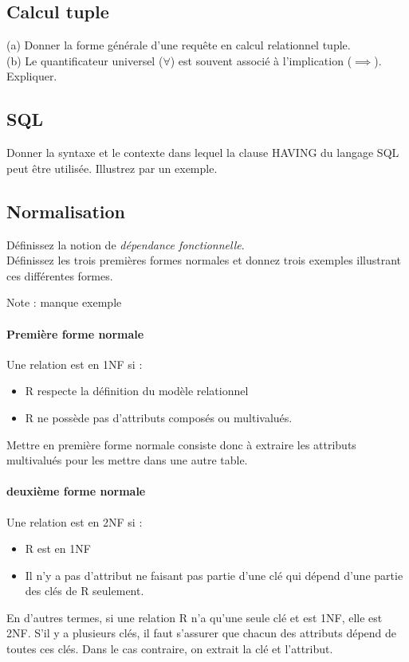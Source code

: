 \subsection{Calcul tuple}

(a) Donner la forme générale d'une requête en calcul relationnel tuple.\\
(b) Le quantificateur universel ($\forall$) est souvent associé à l'implication 
($\implies$). Expliquer.

\subsection{SQL}
Donner la syntaxe et le contexte dans lequel la clause HAVING du langage SQL peut être 
utilisée. Illustrez par un exemple.



\subsection{Normalisation}
Définissez la notion de \textit{dépendance fonctionnelle}. \\
Définissez les trois premières formes normales et donnez trois exemples 
illustrant ces différentes formes.

Note : manque exemple

\paragraph{Première forme normale}
Une relation est en 1NF si : 
\begin{itemize}
	\item R respecte la définition du modèle relationnel
	\item R ne possède pas d'attributs composés ou multivalués.
\end{itemize}
Mettre en première forme normale consiste donc à extraire les attributs multivalués pour les mettre dans une autre table.

\paragraph{deuxième forme normale}
Une relation est en 2NF si : 
\begin{itemize}
	\item R est en 1NF
	\item Il n'y a pas d'attribut ne faisant pas partie d'une clé qui dépend 
	d'une partie des clés de R seulement.
\end{itemize}
En d'autres termes, si une relation R n'a qu'une seule clé et est 1NF, 
elle est 2NF. S'il y a plusieurs clés, il faut s'assurer que chacun des attributs 
dépend de toutes ces clés. Dans le cas contraire, on extrait la clé et l'attribut.


